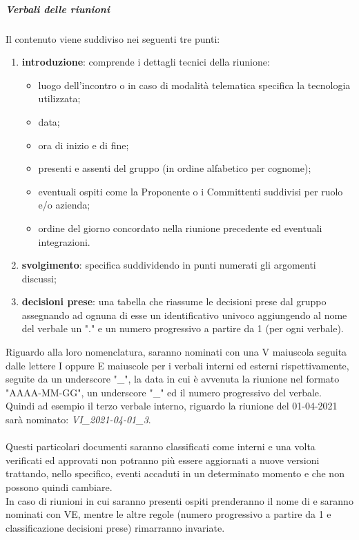             \subparagraph{Verbali delle riunioni}
            Il contenuto viene suddiviso nei seguenti tre punti:
            \begin{enumerate}
                \item \textbf{introduzione}: comprende i dettagli tecnici della riunione:
                \begin{itemize}
                    \item luogo dell'incontro o in caso di modalità telematica specifica la tecnologia utilizzata;
                    \item data;
                    \item ora di inizio e di fine;
                    \item presenti e assenti del gruppo (in ordine alfabetico per cognome);
                    \item eventuali ospiti come la Proponente o i Committenti suddivisi per ruolo e/o azienda;
                    \item ordine del giorno concordato nella riunione precedente ed eventuali integrazioni.
                \end{itemize}
                \item \textbf{svolgimento}: specifica suddividendo in punti numerati gli argomenti discussi;
                \item \textbf{decisioni prese}: una tabella che riassume le decisioni prese dal gruppo assegnando ad ognuna di esse un identificativo univoco aggiungendo al nome del verbale un "." e un numero progressivo a partire da 1 (per ogni verbale).
            \end{enumerate}
            Riguardo alla loro nomenclatura, saranno nominati con una V maiuscola seguita dalle lettere I oppure E maiuscole per i verbali interni ed esterni rispettivamente, seguite da un underscore "\_", la data in cui è avvenuta la riunione nel formato "AAAA-MM-GG", un underscore "\_" ed il numero progressivo del verbale. Quindi ad esempio il terzo verbale interno, riguardo la riunione del 01-04-2021 sarà nominato: \textit{VI\_2021-04-01\_3}.\\
            \\Questi particolari documenti saranno classificati come interni e una volta verificati ed approvati non potranno più essere aggiornati a nuove versioni trattando, nello specifico, eventi accaduti in un determinato momento e che non possono quindi cambiare.
            \\In caso di riunioni in cui saranno presenti ospiti prenderanno il nome di  e saranno nominati con VE, mentre le altre regole (numero progressivo a partire da 1 e classificazione decisioni prese) rimarranno invariate.

